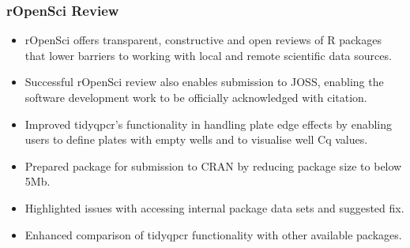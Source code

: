 \documentclass{SBCbookchapter}
\begin{document}
\subsubsection{rOpenSci Review}

\begin{itemize}
    \item rOpenSci offers transparent, constructive and open reviews of R packages that lower barriers to working with local and remote scientific data sources.
    \item Successful rOpenSci review also enables submission to JOSS, enabling the software development work to be officially acknowledged with citation.
    \item Improved tidyqpcr's functionality in handling plate edge effects by enabling users to define plates with empty wells and to visualise well Cq values.
    \item Prepared package for submission to CRAN by reducing package size to below 5Mb.
    \item Highlighted issues with accessing internal package data sets and suggested fix.
    \item Enhanced comparison of tidyqpcr functionality with other available packages.
\end{itemize}
\end{document}
